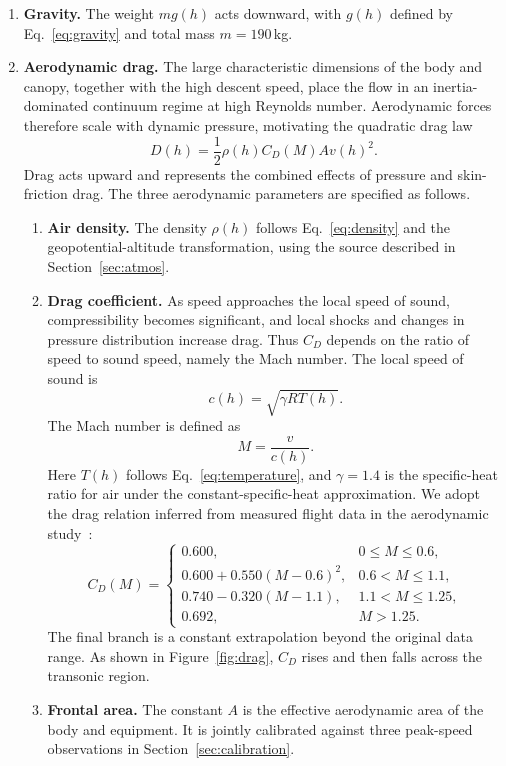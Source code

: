 \documentclass[12pt,a4paper]{article}
\numberwithin{equation}{section}
\begin{document}
\begin{enumerate}
\item \textbf{Gravity.} The weight $mg(h)$ acts downward, with $g(h)$ defined by Eq.~\eqref{eq:gravity} and total mass $m=190$\,kg.
\item \textbf{Aerodynamic drag.} The large characteristic dimensions of the body and canopy, together with the high descent speed, place the flow in an inertia-dominated continuum regime at high Reynolds number. Aerodynamic forces therefore scale with dynamic pressure, motivating the quadratic drag law
\begin{equation}
 D(h)=\frac12\rho(h)C_D(M)A v(h)^2.
 \label{eq:force}
\end{equation}
Drag acts upward and represents the combined effects of pressure and skin-friction drag. The three aerodynamic parameters are specified as follows.
\begin{enumerate}
\renewcommand{\labelenumii}{\arabic{enumii}.}
\item \textbf{Air density.} The density $\rho(h)$ follows Eq.~\eqref{eq:density} and the geopotential-altitude transformation, using the source described in Section~\ref{sec:atmos}.
\item \textbf{Drag coefficient.} As speed approaches the local speed of sound, compressibility becomes significant, and local shocks and changes in pressure distribution increase drag. Thus $C_D$ depends on the ratio of speed to sound speed, namely the Mach number. The local speed of sound is
\[
 c(h)=\sqrt{\gamma RT(h)}.
\]
The Mach number is defined as
\begin{equation*}
 M=\frac{v}{c(h)}.
\end{equation*}
Here $T(h)$ follows Eq.~\eqref{eq:temperature}, and $\gamma=1.4$ is the specific-heat ratio for air under the constant-specific-heat approximation. We adopt the drag relation inferred from measured flight data in the aerodynamic study~\cite{guerster}:
\begin{equation}
 C_D(M)=\begin{cases}
 0.600,&0\le M\le0.6,\\
 0.600+0.550(M-0.6)^2,&0.6<M\le1.1,\\
 0.740-0.320(M-1.1),&1.1<M\le1.25,\\
 0.692,&M>1.25.
 \end{cases}\label{eq:drag}
\end{equation}
The final branch is a constant extrapolation beyond the original data range. As shown in Figure~\ref{fig:drag}, $C_D$ rises and then falls across the transonic region.
\item \textbf{Frontal area.} The constant $A$ is the effective aerodynamic area of the body and equipment. It is jointly calibrated against three peak-speed observations in Section~\ref{sec:calibration}.
\end{enumerate}

\end{enumerate}
\end{document}
